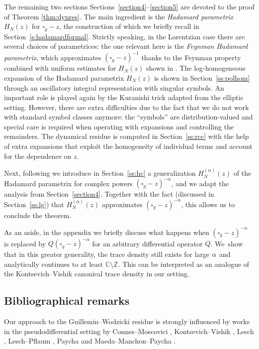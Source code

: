 \documentclass[JEP,XML,SOM,Unicode]{cedram}
\theoremstyle{definition}
\newcommand\zz{{\mathbb Z}}
\newcommand\cc{{\mathbb C}}
\let\cv\alpha
\let\Re\relax
\DeclareMathOperator{\Re}{Re}
\renewcommand{\sec}[1]{Section~\ref{#1}}
\newcommand{\secs}[2]{Sections~\ref{#1}--\ref{#2}}
\begin{document}
The remaining two sections \secs{section4}{section5} are devoted to the proof of Theorem \ref{thm:dynres}.
The main ingredient is the \emph{Hadamard parametrix} $H_N(z)$ for $\square_g-z$, the construction of which we briefly recall in \sec{s:hadamardformal}. Strictly speaking, in the Lorentzian case there are several choices of parametrices: the one relevant here is the \emph{Feynman Hadamard parametrix}, which approximates $(\square_g-z)^{-1}$ thanks to the Feynman property combined with uniform estimates for $H_N(z)$ shown in \cite{Dang2020}. The log-homogeneous expansion of the Hadamard parametrix $H_N(z)$ is shown in \sec{ss:polhom} through an oscillatory integral representation with singular symbols. An important role is played again by the Kuranishi trick adapted from the elliptic setting. However, there are extra difficulties due to the fact that we do not work with standard symbol classes anymore: the ``symbols'' are distribution-valued and special care is required when operating with expansions and controlling the remainders. The dynamical residue is computed in \sec{ss:rcc} with the help of extra expansions that exploit the homogeneity of individual terms and account for the dependence on $z$.

Next, following \cite{Dang2020} we introduce in \sec{ss:hc} a generalization $H_N^{(\cv)}(z)$ of the Hadamard parametrix for complex powers $(\square_g-z)^{-\cv}$, and we adapt the analysis from \sec{section4}. Together with the fact (discussed in \sec{ss:lg}) that $H_N^{(\cv)}(z)$ approximates $(\square_g-z)^{-\cv}$, this allows us to conclude the theorem.

As an aside, in the appendix we briefly discuss what happens when $(\square_g-z)^{-\cv}$ is replaced by $Q(\square_g-z)^{-\cv}$ for an arbitrary differential operator $Q$. We~show that in this greater generality, the trace density still exists for large $\Re \cv$ and analytically continues to at least $\cc\setminus \zz$. This can be interpreted as an analogue of the Kontsevich--Vishik canonical trace density \cite{Kontsevich1995} in our setting.

\subsection{Bibliographical remarks}\label{ss:br}

Our approach to the Guillemin--Wodzicki residue \cite{wodzicki,Guillemin1985} is strongly influenced by works in the pseudodifferential setting by Connes--Moscovici \cite{Connes1995}, Kontsevich--Vishik \cite{Kontsevich1995}, Lesch \cite{Lesch}, Lesch--Pflaum \cite{Lesch2000}, Paycha \cite{paycha2,paycha} and Maeda--Manchon--Paycha \cite{Maeda2005}.
\end{document}
